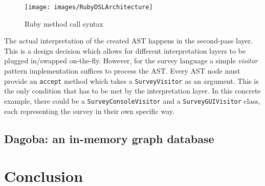 \begin{figure}[!ht]
  	\centering
    	\texttt{[image: images/RubyDSLArchitecture]} 
    	\caption{Ruby method call syntax}
    \label{fig:RubyDSLArchitecture}
\end{figure}

The actual interpretation of the created AST happens in the second-pass layer. This is a design decision which allows for different interpretation layers to be plugged in/swapped on-the-fly. However, for the survey language a simple \textit{visitor} pattern implementation suffices to process the AST. Every AST node must provide an \texttt{accept} method which takes a \texttt{SurveyVisitor} as an argument. This is the only condition that has to be met by the interpretation layer. In this concrete example, there could be a \texttt{SurveyConsoleVisitor} and a \texttt{SurveyGUIVisitor} class, each representing the survey in their own specific way.



\subsection{Dagoba: an in-memory graph database}

\section{Conclusion}